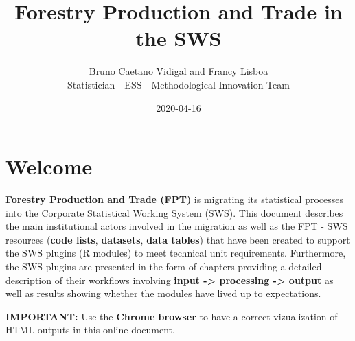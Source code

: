 \documentclass[
]{book}
\title{Forestry Production and Trade in the SWS}
\author{Bruno Caetano Vidigal and Francy Lisboa

Statistician - ESS - Methodological Innovation Team}
\date{2020-04-16}
\begin{document}
\maketitle

{
\setcounter{tocdepth}{1}
\tableofcontents
}
\hypertarget{welcome}{%
\chapter*{\texorpdfstring{\textbf{Welcome}}{Welcome}}\label{welcome}}

\textbf{Forestry Production and Trade (FPT)} is migrating its statistical processes into the Corporate Statistical Working System (SWS). This document describes the main institutional actors involved in the migration as well as the FPT - SWS resources (\textbf{code lists}, \textbf{datasets}, \textbf{data tables}) that have been created to support the SWS plugins (R modules) to meet technical unit requirements. Furthermore, the SWS plugins are presented in the form of chapters providing a detailed description of their workflows involving \textbf{input -\textgreater{} processing -\textgreater{} output} as well as results showing whether the modules have lived up to expectations.

\begin{rmdnote}
\textbf{IMPORTANT:} Use the \textbf{Chrome browser} to have a correct
vizualization of HTML outputs in this online document.
\end{rmdnote}
\end{document}
